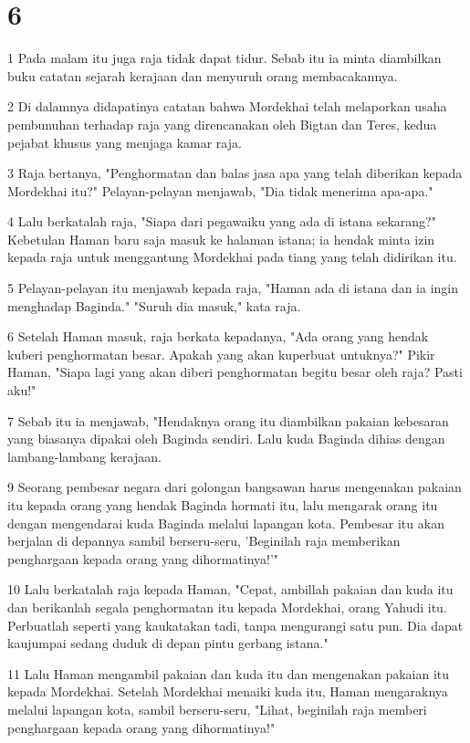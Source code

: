 \chapter{6}

\par 1 Pada malam itu juga raja tidak dapat tidur. Sebab itu ia minta diambilkan buku catatan sejarah kerajaan dan menyuruh orang membacakannya.
\par 2 Di dalamnya didapatinya catatan bahwa Mordekhai telah melaporkan usaha pembunuhan terhadap raja yang direncanakan oleh Bigtan dan Teres, kedua pejabat khusus yang menjaga kamar raja.
\par 3 Raja bertanya, "Penghormatan dan balas jasa apa yang telah diberikan kepada Mordekhai itu?" Pelayan-pelayan menjawab, "Dia tidak menerima apa-apa."
\par 4 Lalu berkatalah raja, "Siapa dari pegawaiku yang ada di istana sekarang?" Kebetulan Haman baru saja masuk ke halaman istana; ia hendak minta izin kepada raja untuk menggantung Mordekhai pada tiang yang telah didirikan itu.
\par 5 Pelayan-pelayan itu menjawab kepada raja, "Haman ada di istana dan ia ingin menghadap Baginda." "Suruh dia masuk," kata raja.
\par 6 Setelah Haman masuk, raja berkata kepadanya, "Ada orang yang hendak kuberi penghormatan besar. Apakah yang akan kuperbuat untuknya?" Pikir Haman, "Siapa lagi yang akan diberi penghormatan begitu besar oleh raja? Pasti aku!"
\par 7 Sebab itu ia menjawab, "Hendaknya orang itu diambilkan pakaian kebesaran yang biasanya dipakai oleh Baginda sendiri. Lalu kuda Baginda dihias dengan lambang-lambang kerajaan.
\par 9 Seorang pembesar negara dari golongan bangsawan harus mengenakan pakaian itu kepada orang yang hendak Baginda hormati itu, lalu mengarak orang itu dengan mengendarai kuda Baginda melalui lapangan kota. Pembesar itu akan berjalan di depannya sambil berseru-seru, 'Beginilah raja memberikan penghargaan kepada orang yang dihormatinya!'"
\par 10 Lalu berkatalah raja kepada Haman, "Cepat, ambillah pakaian dan kuda itu dan berikanlah segala penghormatan itu kepada Mordekhai, orang Yahudi itu. Perbuatlah seperti yang kaukatakan tadi, tanpa mengurangi satu pun. Dia dapat kaujumpai sedang duduk di depan pintu gerbang istana."
\par 11 Lalu Haman mengambil pakaian dan kuda itu dan mengenakan pakaian itu kepada Mordekhai. Setelah Mordekhai menaiki kuda itu, Haman mengaraknya melalui lapangan kota, sambil berseru-seru, "Lihat, beginilah raja memberi penghargaan kepada orang yang dihormatinya!"
